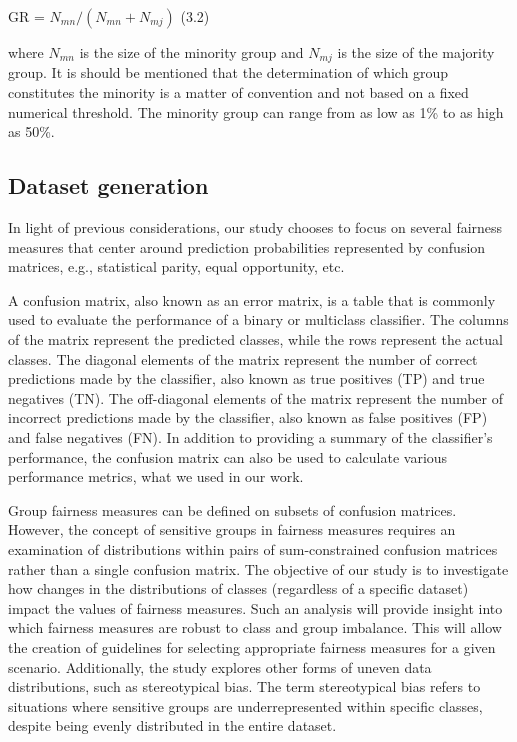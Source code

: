 \documentclass[a4paper, 12pt]{article}
\begin{document}
\begin{center} \hfill GR = $N_{mn}  / (N_{mn} + N_{mj})$  \hfill (3.2)\end{center}

where $N_{mn}$ is the size of the minority group and $N_{mj}$ is the size of the majority group. It is should be mentioned that the determination of which group constitutes the minority is a matter of convention and not based on a fixed numerical threshold. The minority group can range from as low as 1\% to as high as 50\%.

\subsection{Dataset generation}
\large

In light of previous considerations, our study chooses to focus on several fairness measures that center around prediction probabilities represented by confusion matrices, e.g., statistical parity, equal opportunity, etc.

A confusion matrix, also known as an error matrix, is a table that is commonly used to evaluate the performance of a binary or multiclass classifier. The columns of the matrix represent the predicted classes, while the rows represent the actual classes. The diagonal elements of the matrix represent the number of correct predictions made by the classifier, also known as true positives (TP) and true negatives (TN). The off-diagonal elements of the matrix represent the number of incorrect predictions made by the classifier, also known as false positives (FP) and false negatives (FN). In addition to providing a summary of the classifier's performance, the confusion matrix can also be used to calculate various performance metrics, what we used in our work. 

Group fairness measures can be defined on subsets of confusion matrices. However, the concept of sensitive groups in fairness measures requires an examination of distributions within pairs of sum-constrained confusion matrices rather than a single confusion matrix. The objective of our study is to investigate how changes in the distributions of classes (regardless of a specific dataset) impact the values of fairness measures. Such an analysis will provide insight into which fairness measures are robust to class and group imbalance. This will allow the creation of guidelines for selecting appropriate fairness measures for a given scenario. Additionally, the study explores other forms of uneven data distributions, such as stereotypical bias. The term stereotypical bias refers to situations where sensitive groups are underrepresented within specific classes, despite being evenly distributed in the entire dataset.
\end{document}
